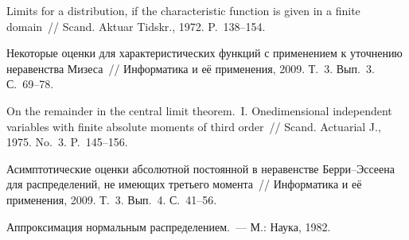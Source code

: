 \begin{multicols}{2}
{{\begin{thebibliography}{99}
 Limits for a distribution, if the characteristic
function is given in a finite domain~// Scand. Aktuar Tidskr., 1972.
P.~138--154.

 Некоторые оценки для характеристических функций
с применением к уточнению неравенства Мизеса~// Информатика и её
применения, 2009. Т.~3. Вып.~3. С.~69--78.


 On the remainder in the central limit theorem.~I.
Onedimensional independent variables with finite absolute moments of
third order~// Scand. Actuarial J., 1975. No.~3. P.~145--156.

 Асимптотические оценки
абсолютной постоянной в неравенстве Берри--Эссеена для
распределений, не имеющих третьего момента~// Информатика и её
применения, 2009. Т.~3. Вып.~4. С.~41--56.

\label{end\stat}

Аппроксимация нормальным распределением.~--- М.: Наука, 1982.
 \end{thebibliography}
}
}

\end{multicols}